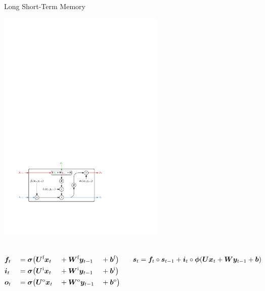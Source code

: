 \documentclass[11pt, xcolor={dvipsnames}, aspectratio=169]{beamer}
\begin{document}

\begin{frame}{Long Short-Term Memory}
  \centering\footnotesize

  \includegraphics[width=0.6\textwidth]{ml/lstm}

  \begin{columns}
    \footnotesize

    \begin{alignat*}{4}
      &\bm{f}_{t} &&= \bm{\sigma}\bigl(\bm{U}^{\text{f}}  \bm{x}_{t} &&+ \bm{W}^{\text{f}}  \bm{y}_{t - 1} &&+ \bm{b}^{\text{f}}\bigr) \\
      &\bm{i}_{t} &&= \bm{\sigma}\bigl(\bm{U}^{\text{i}}  \bm{x}_{t} &&+ \bm{W}^{\text{i}}  \bm{y}_{t - 1} &&+ \bm{b}^{\text{i}}\bigr) \\
      &\bm{o}_{t} &&= \bm{\sigma}\bigl(\bm{U}^{\text{o}}  \bm{x}_{t} &&+ \bm{W}^{\text{o}}  \bm{y}_{t - 1} &&+ \bm{b}^{\text{o}}\bigr)
    \end{alignat*}

    \footnotesize

    \begin{align*}
      \bm{s}_{t} = \bm{f}_{t} \circ \bm{s}_{t - 1}
      + \bm{i}_{t} \circ \bm{\phi}(\bm{U} \bm{x}_{t} + \bm{W} \bm{y}_{t-1} + \bm{b})
    \end{align*}
  \end{columns}
\end{frame}
\end{document}

